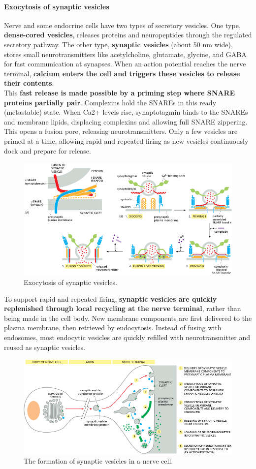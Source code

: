 \documentclass[../main.tex]{subfiles}
\begin{document}
\paragraph{Exocytosis of synaptic vesicles}
Nerve and some endocrine cells have two types of secretory vesicles. One type, \textbf{dense-cored vesicles}, releases proteins and neuropeptides through the regulated secretory pathway. The other type, \textbf{synaptic vesicles} (about 50 nm wide), stores small neurotransmitters like acetylcholine, glutamate, glycine, and GABA for fast communication at synapses. When an action potential reaches the nerve terminal, \textbf{calcium enters the cell and triggers these vesicles to release their contents}.\\
\indent This \textbf{fast release is made possible by a priming step where SNARE proteins partially pair}. Complexins hold the SNAREs in this ready (metastable) state. When Ca2+ levels rise, synaptotagmin binds to the SNAREs and membrane lipids, displacing complexins and allowing full SNARE zippering. This opens a fusion pore, releasing neurotransmitters. Only a few vesicles are primed at a time, allowing rapid and repeated firing as new vesicles continuously dock and prepare for release.
\begin{figure}[H]
	\centering
	\includegraphics[width= \textwidth]{51}
	\caption{Exocytosis of synaptic vesicles.}
\end{figure}
To support rapid and repeated firing, \textbf{synaptic vesicles are quickly replenished through local recycling at the nerve terminal}, rather than being made in the cell body. New membrane components are first delivered to the plasma membrane, then retrieved by endocytosis. Instead of fusing with endosomes, most endocytic vesicles are quickly refilled with neurotransmitter and reused as synaptic vesicles.
\begin{figure}[H]
	\centering
	\includegraphics[width= 0.9   \textwidth]{50}
	\caption{The formation of synaptic vesicles in a nerve cell.}
\end{figure}
\end{document}
